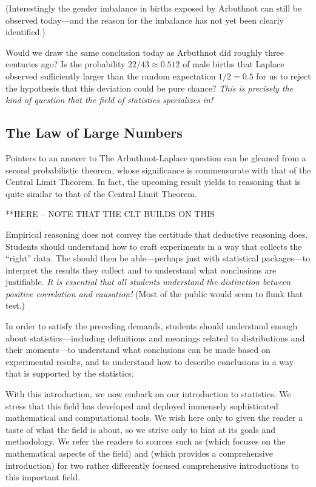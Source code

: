 \medskip

\noindent
(Interestingly the gender imbalance in births exposed by Arbuthnot can still be observed today---and the reason for the imbalance has not yet been clearly identified.)

\medskip

Would we draw the same conclusion today as Arbuthnot did roughly three centuries ago?  Is the probability $22/43 \approx 0.512$ of male births that Laplace observed sufficiently larger than the random expectation $1/2 = 0.5$ for us to reject the hypothesis that this deviation could be pure chance?  {\em This is precisely the kind of question that the field of statistics specializes in!}

\subsection{The Law of Large Numbers}
\label{sec:Large-Numbers}

 

Pointers to an answer to The Arbuthnot-Laplace question can be gleaned from a second probabilistic theorem, whose significance is commensurate with that of the Central Limit Theorem.  In fact, the upcoming result yields to reasoning that is quite similar to that of the Central Limit Theorem.




**HERE -- NOTE THAT THE CLT BUILDS ON THIS


\bigskip
 
Empirical reasoning does not convey the certitude that deductive
reasoning does.  Students should understand how to craft experiments
in a way that collects the ``right'' data.  The should then be
able---perhaps just with statistical packages---to interpret the
results they collect and to understand what conclusions are
justifiable.  {\em It is essential that all students understand the                  
  distinction between {\em positive correlation} and {\em causation}!}
(Most of the public would seem to flunk that test.)

In order to satisfy the preceding demands, students should understand
enough about statistics---including definitions and meanings related
to distributions and their moments---to understand what conclusions
can be made based on experimental results, and to understand how to
describe conclusions in a way that is supported by the statistics.


With this introduction, we now embark on our introduction to statistics.  We stress that this
field has developed and deployed immensely sophisticated mathematical and
computational tools.  We wish here only to given the reader a taste of what the field is
about, so we strive only to hint at its goals and methodology.  We refer the readers to sources
such as \cite{Hoel58} (which focuses on the mathematical aspects of the field) and 
\cite{Bremaud17}  (which provides a comprehensive introduction) for two rather differently
focused comprehensive introductions to this important field.

